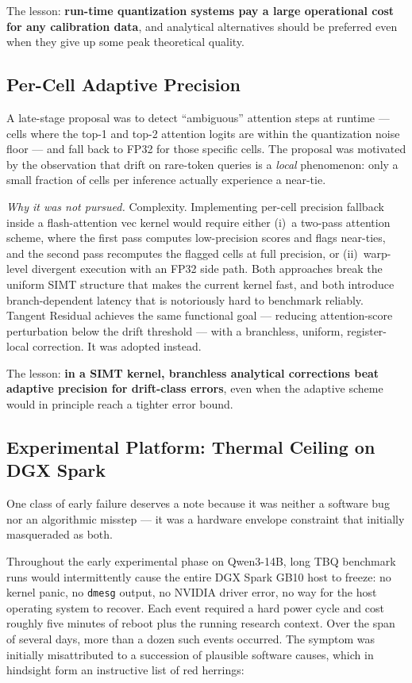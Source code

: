 \documentclass[10pt,twocolumn]{article}
\begin{document}
The lesson: \textbf{run-time quantization systems pay a large operational cost for any calibration data}, and analytical alternatives should be preferred even when they give up some peak theoretical quality.

\subsection{Per-Cell Adaptive Precision}

A late-stage proposal was to detect ``ambiguous'' attention steps at runtime --- cells where the top-1 and top-2 attention logits are within the quantization noise floor --- and fall back to FP32 for those specific cells. The proposal was motivated by the observation that drift on rare-token queries is a \emph{local} phenomenon: only a small fraction of cells per inference actually experience a near-tie.

\emph{Why it was not pursued.} Complexity. Implementing per-cell precision fallback inside a flash-attention vec kernel would require either (i)~a two-pass attention scheme, where the first pass computes low-precision scores and flags near-ties, and the second pass recomputes the flagged cells at full precision, or (ii)~warp-level divergent execution with an FP32 side path. Both approaches break the uniform SIMT structure that makes the current kernel fast, and both introduce branch-dependent latency that is notoriously hard to benchmark reliably. Tangent Residual achieves the same functional goal --- reducing attention-score perturbation below the drift threshold --- with a branchless, uniform, register-local correction. It was adopted instead.

The lesson: \textbf{in a SIMT kernel, branchless analytical corrections beat adaptive precision for drift-class errors}, even when the adaptive scheme would in principle reach a tighter error bound.

\subsection{Experimental Platform: Thermal Ceiling on DGX Spark}

One class of early failure deserves a note because it was neither a software bug nor an algorithmic misstep --- it was a hardware envelope constraint that initially masqueraded as both.

Throughout the early experimental phase on Qwen3-14B, long TBQ benchmark runs would intermittently cause the entire DGX Spark GB10 host to freeze: no kernel panic, no \texttt{dmesg} output, no NVIDIA driver error, no way for the host operating system to recover. Each event required a hard power cycle and cost roughly five minutes of reboot plus the running research context. Over the span of several days, more than a dozen such events occurred. The symptom was initially misattributed to a succession of plausible software causes, which in hindsight form an instructive list of red herrings:
\end{document}
